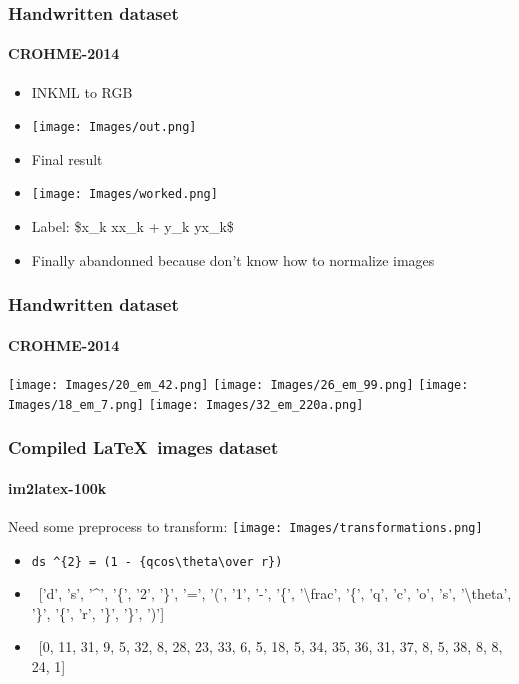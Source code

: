 \documentclass{beamer}
\begin{document}
\begin{frame}

    \frametitle{Handwritten dataset}
    \framesubtitle{\hfill CROHME-2014}
    
\begin{center}
\begin{itemize}[label=$\bullet$]
  \item INKML to RGB
  \item \texttt{[image: Images/out.png]}
  \item Final result
  \item \texttt{[image: Images/worked.png]}
  \item Label: \$x\_k xx\_k + y\_k yx\_k\$
  \item Finally abandonned because don't know how to normalize images
\end{itemize}
\end{center}

\end{frame}

\begin{frame}

    \frametitle{Handwritten dataset}
    \framesubtitle{\hfill CROHME-2014}
    
\texttt{[image: Images/20\_em\_42.png]}
\texttt{[image: Images/26\_em\_99.png]}
\texttt{[image: Images/18\_em\_7.png]}
\texttt{[image: Images/32\_em\_220a.png]}

\end{frame}

\begin{frame}

    \frametitle{Compiled \LaTeX~images dataset}
    \framesubtitle{\hfill im2latex-100k}

Need some preprocess to transform:
\newline
\texttt{[image: Images/transformations.png]}
\begin{itemize}[label=$\bullet$]
    \item
        \texttt{ds \textasciicircum\{2\} = (1 - \{qcos{\textbackslash}theta{\textbackslash}over r\})}
    \item
        ~['d', 's', '\textasciicircum', '\{', '2', '\}', '=', '(', '1', '-', '\{', '{\textbackslash}frac', '\{', 'q', 'c', 'o', 's', '{\textbackslash}theta', '\}', '\{', 'r', '\}', '\}', ')']
    \item
        ~[0, 11, 31, 9, 5, 32, 8, 28, 23, 33, 6, 5, 18, 5, 34, 35, 36, 31, 37, 8, 5, 38, 8, 8, 24, 1]
\end{itemize}

\end{frame}
\end{document}
